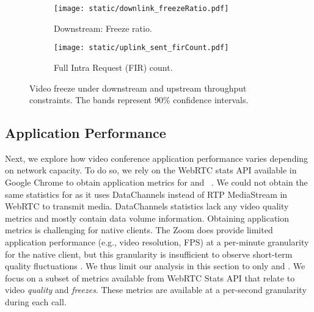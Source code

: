 \begin{figure}[t]
    \centering
    \begin{subfigure}[t]{0.4\textwidth}      
        \texttt{[image: static/downlink\_freezeRatio.pdf]}
        \vspace{-1em}
        \caption{Downstream: Freeze ratio.}
 		\label{subfig:downlink_freeze_ratio}
    \end{subfigure}
	\begin{subfigure}[t]{0.4\textwidth}   
        \centering
        \texttt{[image: static/uplink\_sent\_firCount.pdf]}
    \vspace{-1em}
    \caption{Full Intra Request (FIR) count.}
    \label{subfig:uplink_fir}
    \end{subfigure}%
    \vspace{-1em}
	\caption{Video freeze under downstream and upstream throughput constraints. The bands represent 90\% confidence intervals.%
	}
	\label{fig:video_freeze}
\end{figure}







\subsection{Application Performance}
\label{subsec:application_performance}

Next, we explore how video conference application performance varies depending
on network capacity.  To do so, we rely on the WebRTC stats API
available in Google Chrome to obtain application metrics for \teamsbrowser and
\meet~\cite{webrtc_stats}. We could not obtain the same statistics for
\zoombrowser as it uses DataChannels instead of RTP MediaStream in WebRTC to
transmit media. DataChannels statistics lack any video quality metrics and
mostly contain data volume information. Obtaining application metrics is
challenging for native clients. The Zoom  does provide limited
application performance (e.g., video resolution, FPS) at a per-minute
granularity for the native client, but this granularity is insufficient to
observe short-term quality fluctuations . We thus limit our analysis in this
section to only \meet and \teamsbrowser. We focus on a subset of metrics
available from WebRTC Stats API that relate to video \textit{quality} and
\textit{freezes}. These metrics are available at a per-second granularity
during each call. 

